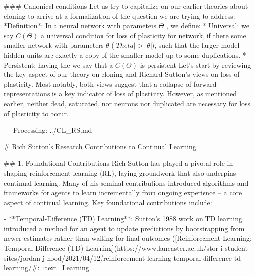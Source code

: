 ### Canonical conditions
Let us try to capitalize on our earlier theories about cloning to arrive at a formalization of the question we are trying to address: 
 *Definition*: In a neural network with parameters $\Theta$ , we define:
* Universal: we say $C(\Theta)$ a universal condition for loss of plasticity for network, if there some smaller network  with parameters $\theta$ ($|Theta| > |\theta|$), such that the larger model hidden units are exactly a copy of the smaller model up to some duplications. 
* Persistent:  having the we say that a $C(\Theta)$ is persistent
Let’s start by reviewing the key aspect of our theory on cloning and Richard Sutton’s views on loss of plasticity. Most notably, both views suggest that  a collapse of forward representations is a key indicator of loss of plasticity. However, as mentioned earlier, neither dead, saturated, nor neurons nor duplicated are necessary for loss of plasticity to occur. 




--- Processing: ../CL_RS.md ---

# Rich Sutton's Research Contributions to Continual Learning

## 1. Foundational Contributions
Rich Sutton has played a pivotal role in shaping reinforcement learning (RL), laying groundwork that also underpins continual learning. Many of his seminal contributions introduced algorithms and frameworks for agents to learn incrementally from ongoing experience – a core aspect of continual learning. Key foundational contributions include:

- **Temporal-Difference (TD) Learning**: Sutton’s 1988 work on TD learning introduced a method for an agent to update predictions by bootstrapping from newer estimates rather than waiting for final outcomes ([Reinforcement Learning: Temporal Difference (TD) Learning](https://www.lancaster.ac.uk/stor-i-student-sites/jordan-j-hood/2021/04/12/reinforcement-learning-temporal-difference-td-learning/#:~:text=Learning%

